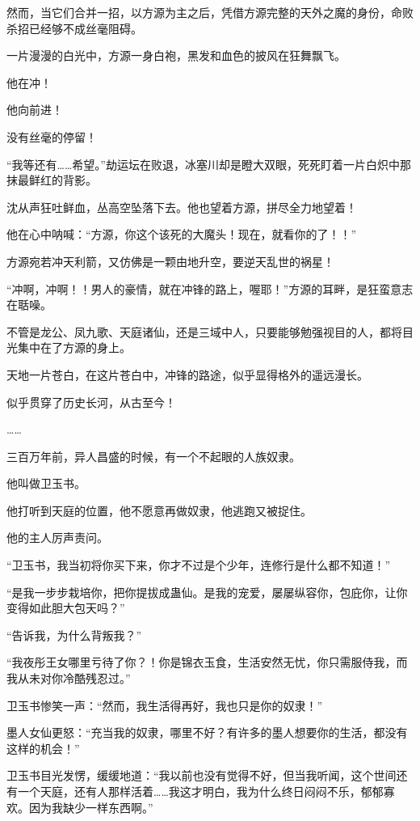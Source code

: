 \begin{this_body}
然而，当它们合并一招，以方源为主之后，凭借方源完整的天外之魔的身份，命败杀招已经够不成丝毫阻碍。

一片漫漫的白光中，方源一身白袍，黑发和血色的披风在狂舞飘飞。

他在冲！

他向前进！

没有丝毫的停留！

“我等还有……希望。”劫运坛在败退，冰塞川却是瞪大双眼，死死盯着一片白炽中那抹最鲜红的背影。

沈从声狂吐鲜血，丛高空坠落下去。他也望着方源，拼尽全力地望着！

他在心中呐喊：“方源，你这个该死的大魔头！现在，就看你的了！！”

方源宛若冲天利箭，又仿佛是一颗由地升空，要逆天乱世的祸星！

“冲啊，冲啊！！男人的豪情，就在冲锋的路上，喔耶！”方源的耳畔，是狂蛮意志在聒噪。

不管是龙公、凤九歌、天庭诸仙，还是三域中人，只要能够勉强视目的人，都将目光集中在了方源的身上。

天地一片苍白，在这片苍白中，冲锋的路途，似乎显得格外的遥远漫长。

似乎贯穿了历史长河，从古至今！

……

三百万年前，异人昌盛的时候，有一个不起眼的人族奴隶。

他叫做卫玉书。

他打听到天庭的位置，他不愿意再做奴隶，他逃跑又被捉住。

他的主人厉声责问。

“卫玉书，我当初将你买下来，你才不过是个少年，连修行是什么都不知道！”

“是我一步步栽培你，把你提拔成蛊仙。是我的宠爱，屡屡纵容你，包庇你，让你变得如此胆大包天吗？”

“告诉我，为什么背叛我？”

“我夜彤王女哪里亏待了你？！你是锦衣玉食，生活安然无忧，你只需服侍我，而我从未对你冷酷残忍过。”

卫玉书惨笑一声：“然而，我生活得再好，我也只是你的奴隶！”

墨人女仙更怒：“充当我的奴隶，哪里不好？有许多的墨人想要你的生活，都没有这样的机会！”

卫玉书目光发愣，缓缓地道：“我以前也没有觉得不好，但当我听闻，这个世间还有一个天庭，还有人那样活着……我这才明白，我为什么终日闷闷不乐，郁郁寡欢。因为我缺少一样东西啊。”


\end{this_body}
